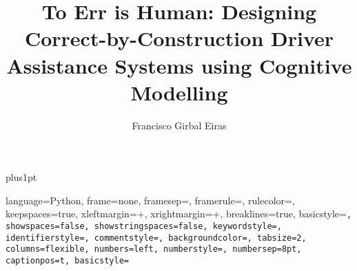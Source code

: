\documentclass[12pt]{ociamthesis}  %
\title{To Err is Human: Designing Correct-by-Construction Driver Assistance Systems using Cognitive Modelling}
\author{Francisco Girbal Eiras}             %
\theoremstyle{definition}
\theoremstyle{definition}
\begin{document}
\baselineskip=18pt plus1pt
\setlength{\parindent}{0em}
\setlength{\parskip}{1em}

\setcounter{secnumdepth}{3}
\setcounter{tocdepth}{3}

\newcommand{\red}[1]{\textcolor{red}{#1}}

{\setlength{\parskip}{0em} \maketitle}                  %

\begin{romanpages}          %
{\setlength{\parskip}{1pt} \tableofcontents }            %
\end{romanpages}            %









\renewcommand{\lstlistingname}{File}

\lstset
{
    language={Python},
    frame=none,
    framesep=\fboxsep,
    framerule=\fboxrule,
    rulecolor=\color{gray},
    keepspaces=true,
    xleftmargin=\dimexpr\fboxsep+\fboxrule,
    xrightmargin=\dimexpr\fboxsep+\fboxrule,
    breaklines=true,
    basicstyle=\small\tt,
    showspaces=false,
    showstringspaces=false,
    keywordstyle=\color{blue}\sf,
    identifierstyle=\color{black},
    commentstyle=\color{cyan},
    backgroundcolor=\color{white},
    tabsize=2,
    columns=flexible,
    numbers=left, 
    numberstyle=\tiny\color{mygray}, 
    numbersep=8pt,
    captionpos=t,
    basicstyle=\fontsize{10}{11}\sffamily
}

\appendix





\end{document}
